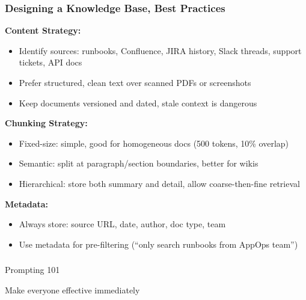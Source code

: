 \begin{frame}[fragile]\frametitle{Designing a Knowledge Base, Best Practices}
\textbf{Content Strategy:}
\begin{itemize}
\item Identify sources: runbooks, Confluence, JIRA history, Slack threads, support tickets, API docs
\item Prefer structured, clean text over scanned PDFs or screenshots
\item Keep documents versioned and dated, stale context is dangerous
\end{itemize}

\textbf{Chunking Strategy:}
\begin{itemize}
\item Fixed-size: simple, good for homogeneous docs (500 tokens, 10\% overlap)
\item Semantic: split at paragraph/section boundaries, better for wikis
\item Hierarchical: store both summary and detail, allow coarse-then-fine retrieval
\end{itemize}

\textbf{Metadata:}
\begin{itemize}
\item Always store: source URL, date, author, doc type, team
\item Use metadata for pre-filtering (``only search runbooks from AppOps team'')
\end{itemize}
\end{frame}


\begin{frame}[fragile]\frametitle{}
\begin{center}
{\Large Prompting 101}

{\small Make everyone effective immediately}
\end{center}
\end{frame}

